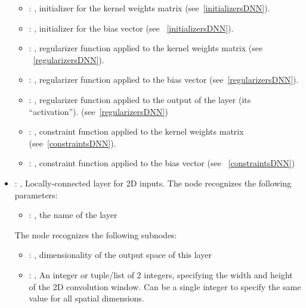 \begin{itemize}
\begin{itemize}
        \item {}: , 
          initializer for the kernel weights matrix (see~\ref{initializersDNN}).

        \item {}: , 
          initializer for the bias vector (see ~\ref{initializersDNN}).

        \item {}: , 
          regularizer function applied to the kernel weights matrix (see ~\ref{regularizersDNN}).

        \item {}: , 
          regularizer function applied to the bias vector (see~\ref{regularizersDNN}).

        \item {}: , 
          regularizer function applied to the output         of the layer (its ``activation'').
          (see~\ref{regularizersDNN})

        \item {}: , 
          constraint function applied to the kernel weights matrix (see~\ref{constraintsDNN}).

        \item {}: , 
          constraint function applied to the bias vector (see ~\ref{constraintsDNN})
      \end{itemize}

    \item {}: , 
      Locally-connected layer for 2D inputs.
      The  node recognizes the following parameters:
        \begin{itemize}
          \item {}: , 
            the name of the layer
      \end{itemize}

      The  node recognizes the following subnodes:
      \begin{itemize}
        \item {}: , 
          dimensionality of the output space of this layer

        \item {}: , 
          An integer or tuple/list of 2 integers, specifying the width and height of the 2D
          convolution window.         Can be a single integer to specify the same value for all
          spatial dimensions.


\end{itemize}
\end{itemize}
